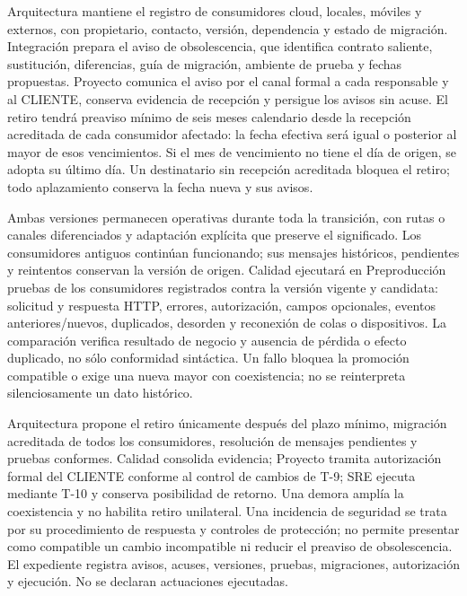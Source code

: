 Arquitectura mantiene el registro de consumidores cloud, locales, móviles y externos, con propietario, contacto, versión, dependencia y estado de migración. Integración prepara el aviso de obsolescencia, que identifica contrato saliente, sustitución, diferencias, guía de migración, ambiente de prueba y fechas propuestas. Proyecto comunica el aviso por el canal formal a cada responsable y al CLIENTE, conserva evidencia de recepción y persigue los avisos sin acuse. El retiro tendrá preaviso mínimo de seis meses calendario desde la recepción acreditada de cada consumidor afectado: la fecha efectiva será igual o posterior al mayor de esos vencimientos. Si el mes de vencimiento no tiene el día de origen, se adopta su último día. Un destinatario sin recepción acreditada bloquea el retiro; todo aplazamiento conserva la fecha nueva y sus avisos.

Ambas versiones permanecen operativas durante toda la transición, con rutas o canales diferenciados y adaptación explícita que preserve el significado. Los consumidores antiguos continúan funcionando; sus mensajes históricos, pendientes y reintentos conservan la versión de origen. Calidad ejecutará en Preproducción pruebas de los consumidores registrados contra la versión vigente y candidata: solicitud y respuesta HTTP, errores, autorización, campos opcionales, eventos anteriores/nuevos, duplicados, desorden y reconexión de colas o dispositivos. La comparación verifica resultado de negocio y ausencia de pérdida o efecto duplicado, no sólo conformidad sintáctica. Un fallo bloquea la promoción compatible o exige una nueva mayor con coexistencia; no se reinterpreta silenciosamente un dato histórico.

Arquitectura propone el retiro únicamente después del plazo mínimo, migración acreditada de todos los consumidores, resolución de mensajes pendientes y pruebas conformes. Calidad consolida evidencia; Proyecto tramita autorización formal del CLIENTE conforme al control de cambios de T-9; SRE ejecuta mediante T-10 y conserva posibilidad de retorno. Una demora amplía la coexistencia y no habilita retiro unilateral. Una incidencia de seguridad se trata por su procedimiento de respuesta y controles de protección; no permite presentar como compatible un cambio incompatible ni reducir el preaviso de obsolescencia. El expediente registra avisos, acuses, versiones, pruebas, migraciones, autorización y ejecución. No se declaran actuaciones ejecutadas.








